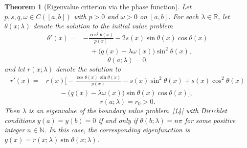 \documentclass[11pt, reqno]{amsart}
\numberwithin{equation}{section}  %
\theoremstyle{plain}
\newtheorem{theorem}{Theorem}[section]
\theoremstyle{definition}
\theoremstyle{remark}
\begin{document}
\begin{theorem}[Eigenvalue criterion via the phase function]
\label{thm:phasefunction}
Let $p, s, q, \omega \in C([a,b])$ with $p > 0$ and $\omega > 0$ on $[a,b]$. For each $\lambda \in \mathbb{R}$, let $\theta(x; \lambda)$ denote the solution to the initial value problem
\begin{equation}\label{phase_lambda}
\begin{aligned}
\theta'(x)
={}&
-\frac{\cos^2\theta(x)}{p(x)}
- 2s(x)\sin\theta(x)\cos\theta(x) \\
&\quad
+ \bigl(q(x)-\lambda\omega(x)\bigr)\sin^2\theta(x),
\end{aligned}
\end{equation}
\[
\theta(a;\lambda)=0.
\]
and let $r(x; \lambda)$ denote the solution to
\begin{equation}\label{amp_lambda}
\begin{aligned}
r'(x)
={}&
r(x)\Bigg[
-\frac{\cos\theta(x)\,\sin\theta(x)}{p(x)}
- s(x)\sin^2\theta(x)
+ s(x)\cos^2\theta(x)\\
&\qquad
- \bigl(q(x)-\lambda\omega(x)\bigr)\sin\theta(x)\cos\theta(x)
\Bigg],
\end{aligned}
\end{equation}
\[
r(a;\lambda)=r_0>0.
\]
Then $\lambda$ is an eigenvalue of the boundary value problem~\eqref{14} with Dirichlet conditions $y(a) = y(b) = 0$ if and only if $\theta(b; \lambda) = n\pi$ for some positive integer $n \in \mathbb{N}$. In this case, the corresponding eigenfunction is $y(x) = r(x; \lambda)\sin\theta(x; \lambda)$.
\end{theorem}
\end{document}
